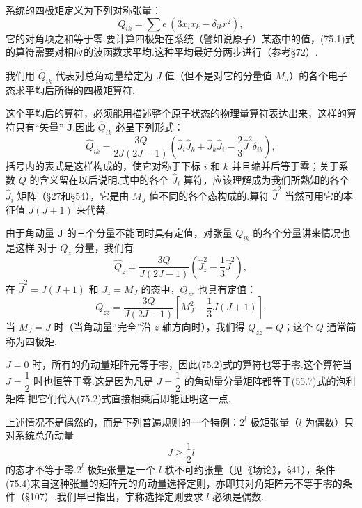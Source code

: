 系统的四极矩定义为下列对称张量：
\begin{equation}
  Q_{ik}=\sum e\,(3x_ix_k-\delta_{ik}r^{2}),
\end{equation}
它的对角项之和等于零.要计算四极矩在系统（譬如说原子）某态中的值，(75.1)式的算符需要对相应的波函数求平均.这种平均最好分两步进行（参考§72）.

我们用 $\hat{Q}_{ik}$ 代表对总角动量给定为 $J$ 值（但不是对它的分量值 $M_J$）的各个电子态求平均后所得的四极矩算符.

这个平均后的算符，必须能用描述整个原子状态的物理量算符表达出来，这样的算符只有“矢量” $\hat{\boldsymbol{J}}$.因此 $\hat{Q}_{ik}$ 必呈下列形式：
\begin{equation}
  \hat{Q}_{ik}=\frac{3Q}{2J(2J-1)}
  \left(\hat{J}_i\hat{J}_k+\hat{J}_k\hat{J}_i-\frac{2}{3}\hat{J}^{2}\delta_{ik}\right),
\end{equation}
括号内的表式是这样构成的，使它对称于下标 $i$ 和 $k$ 并且缩并后等于零；关于系数 $Q$ 的含义留在以后说明.式中的各个 $\hat{J}_i$ 算符，应该理解成为我们所熟知的各个 $\hat{J}_i$ 矩阵（§27和§54），它是由 $M_J$ 值不同的各个态构成的.算符 $\hat{J}^{2}$ 当然可用它的本征值 $J(J+1)$ 来代替.

由于角动量 $\boldsymbol{J}$ 的三个分量不能同时具有定值，对张量 $Q_{ik}$ 的各个分量讲来情况也是这样.对于 $Q_z$ 分量，我们有
\begin{equation*}
  \hat{Q}_z=\frac{3Q}{J(2J-1)}
  \left(\hat{J}_z^{2}-\frac{1}{3}\hat{J}^{2}\right),
\end{equation*}
在 $\hat{J}^{2}=J(J+1)$ 和 $J_z=M_J$ 的态中，$Q_{zz}$ 也具有定值：
\begin{equation}
  Q_{zz}=\frac{3Q}{J(2J-1)}
  \left[M_J^{2}-\frac{1}{3}J(J+1)\right].
\end{equation}
当 $M_J=J$ 时（当角动量“完全”沿 $z$ 轴方向时），我们得 $Q_{zz}=Q$；这个 $Q$ 通常简称为四极矩.

$J=0$ 时，所有的角动量矩阵元等于零，因此(75.2)式的算符也等于零.这个算符当 $J=\dfrac{1}{2}$ 时也恒等于零.这是因为凡是 $J=\dfrac{1}{2}$ 的角动量分量矩阵都等于(55.7)式的泡利矩阵.把它们代入(75.2)式直接相乘后即能证明这一点.

上述情况不是偶然的，而是下列普遍规则的一个特例：$2^{l}$ 极矩张量（$l$ 为偶数）只对系统总角动量
\begin{equation}
  J\geqslant\frac{1}{2}l
\end{equation}
的态才不等于零.$2^{l}$ 极矩张量是一个 $l$ 秩不可约张量（见《场论》，§41），条件(75.4)来自这种张量的矩阵元的角动量选择定则，亦即其对角矩阵元不等于零的条件（§107）.我们早已指出，宇称选择定则要求 $l$ 必须是偶数.

